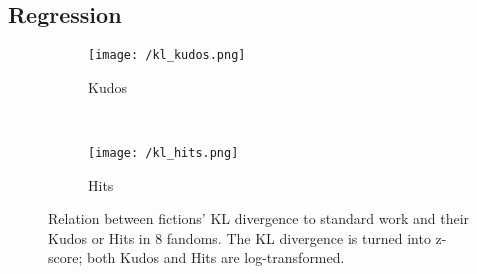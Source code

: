 \documentclass[11pt]{article} %
\begin{document}
\subsection{Regression}




\begin{figure*}[t!]
    \centering
    \begin{subfigure}[t]{0.7\textwidth}
        \centering
        \texttt{[image: /kl\_kudos.png]}
        \caption{Kudos}
    \end{subfigure}%
    ~ 
    \begin{subfigure}[t]{0.3\textwidth}
        \centering
        \texttt{[image: /kl\_hits.png]}
        \caption{Hits}
    \end{subfigure}
    \caption{Relation between fictions' KL divergence to standard work and their Kudos or Hits in 8 fandoms. The KL divergence is turned into z-score; both Kudos and Hits are log-transformed. }
    \label{fig:kl_fields}
\end{figure*}










\printbibliography
    
\end{document}
